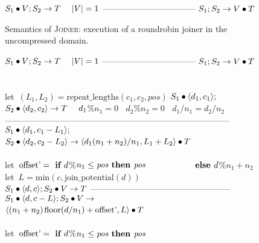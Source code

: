 \begin{figure}[t]
$S_1 \bullet V; S_2 \rightarrow T~~~~|V|=1$\skiptopb
---------------------------------\skipbot
$S_1; S_2 \rightarrow V \bullet T$
\caption{Semantics of \textsc{Joiner}: execution of a roundrobin
  joiner in the uncompressed domain.
\protect\label{fig:uncompressed-joiner}}
\end{figure}

\begin{figure}
$S_1 \bullet V; S_2 \rightarrow T~~~~|V|=1$\skiptopb
---------------------------------\skipbot
$S_1; S_2 \rightarrow V \bullet T$
~ \\ ~ \\
let~$(L_1, L_2) = \mbox{repeat\_lengths}(c_1, c_2, pos)$\skiptopb
$S_1 \bullet \langle d_1, c_1\rangle;$\\
$S_2 \bullet \langle d_2, c_2\rangle \rightarrow T~~~~d_1$\%$n_1=0~~~~d_2$\%$n_2=0~~~~d_1/n_1=d_2/n_2$\vspace{-3pt}\skiptopa
--------------------------------------------------------------------------------\skipbot
$S_1 \bullet \langle d_1, c_1-L_1\rangle;$\\
$S_2 \bullet \langle d_2, c_2-L_2\rangle \rightarrow \langle d_1(n_1+n_2)/n_1, L_1+L_2\rangle \bullet T$
~ \\ ~ \\
let~$\mbox{offset'} = \mbox{\bf ~if~} d$\%$n_1 \leq \mbox{\it pos} \mbox{\bf ~then~} \mbox{\it pos}$\skiptopb
$\mbox{~~~~}\hspace{37.7pt}\mbox{\bf ~else~} d$\%$n_1 + n_2$\\
let~$L=\mbox{min}(c,\mbox{join\_potential}(d))$\\
$S_1 \bullet \langle d, c\rangle; S_2 \bullet V \rightarrow T$\vspace{-3pt}\skiptopa
--------------------------------------------------\skipbot
$S_1 \bullet \langle d, c-L\rangle; S_2 \bullet V \rightarrow$\\
$\langle(n_1 + n_2){\hspace{1.3pt}}\mbox{floor}(d/n_1) + \mbox{offset'}, L\rangle \bullet T$
~ \\ ~ \\
let~$\mbox{offset'} = \mbox{\bf ~if~} d$\%$n_1 \leq \mbox{\it pos} \mbox{\bf ~then~} \mbox{\it pos}$\skiptopb

\end{figure}
